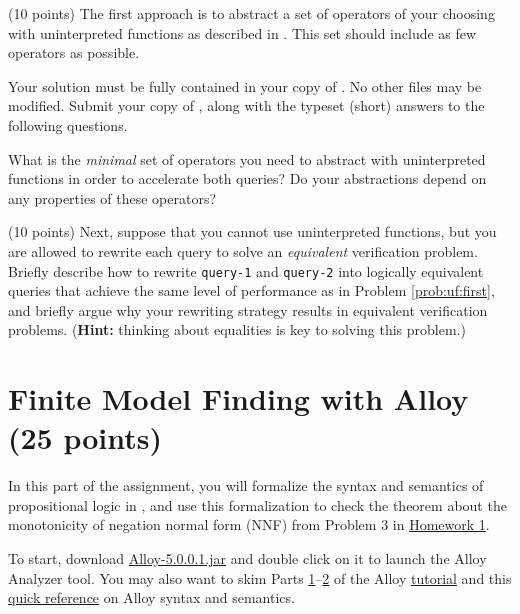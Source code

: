 \documentclass{handout}
\begin{document}
\begin{questions}
\item \label{prob:uf:first} (10 points) The first approach is to abstract a set
of operators of your choosing with uninterpreted functions as described in
.  This set should include as few operators as possible.

Your solution must be fully contained in your copy of .  No
other files may be modified.  Submit your copy of , along with
the typeset (short) answers to the following questions.

What is the \emph{minimal} set of operators you need to abstract with
uninterpreted functions in order to accelerate both queries?   Do your
abstractions depend on any properties of these operators?



\item \label{prob:uf:last} (10 points)  Next, suppose that you cannot use
uninterpreted functions, but you are allowed to rewrite each query to solve an
\emph{equivalent} verification problem.  Briefly describe how to rewrite
\texttt{query-1} and \texttt{query-2} into logically equivalent queries that
achieve the same level of performance as in Problem \ref{prob:uf:first}, and
briefly argue why your rewriting strategy results in equivalent verification
problems. (\textbf{Hint:}  thinking about equalities is key to solving this
problem.)



\end{questions}

\section{Finite Model Finding with Alloy (25 points)}

In this part of the assignment, you will formalize the syntax and semantics of
propositional logic in \alloy, and use this formalization to check the theorem
about the monotonicity of negation normal form (NNF) from Problem 3 in
\href{\website/doc/hw1.pdf}{Homework 1}.

To start, download
\href{https://github.com/AlloyTools/org.alloytools.alloy/releases/download/v5.0.0.1/Alloy-5.0.0.1.jar}{Alloy-5.0.0.1.jar}
and double click on it to launch the Alloy Analyzer tool.  You may also want to
skim Parts
\href{http://alloytools.org/tutorials/day-course/s1_logic.pdf}{1}--\href{http://alloytools.org/tutorials/day-course/s2_language.pdf}{2}
of the Alloy \href{http://alloytools.org/tutorials/day-course/}{tutorial} and
this
\href{http://homepage.cs.uiowa.edu/~tinelli/classes/181/Fall17/Notes/alloy-cheatsheet.pdf}{quick
reference} on Alloy syntax and semantics.
\end{document}
